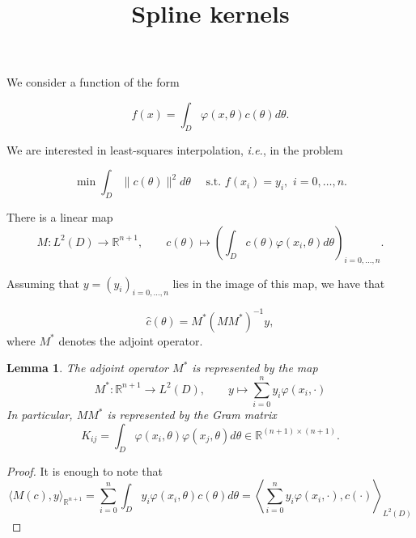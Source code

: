 \documentclass{article}
\title{{\bf Spline kernels}}
\author{}
\date{}
\newtheorem{lemma}[theorem]{Lemma}
\newcommand{\RR}{\mathbb{R}}
\newcommand{\ie}{{\em i.e.}}
\begin{document}
\maketitle


We consider a function of the form

\begin{equation}\label{eq:4-1-1}
f(x) = \int_D \varphi(x,\theta) c(\theta) d\theta.
\end{equation}

We are interested in least-squares interpolation, \ie, in the problem

\begin{equation}\label{eq:4-1-min}
\min \int_D \|c(\theta)\|^2 d\theta \quad \mbox{ s.t. } f(x_i) = y_i, \,\, i=0,\ldots,n.
\end{equation}

There is a linear map
\begin{equation}
M: L^2(D) \rightarrow \RR^{n+1}, \qquad c(\theta) \mapsto \left(\int_D c(\theta) \varphi(x_i,\theta) d\theta \right)_{i=0,\ldots,n}.
\end{equation}

Assuming that $y = (y_i)_{i=0,\ldots,n}$ lies in the image of this map, we have that 

\begin{equation}
    \hat c(\theta) = M^* (MM^*)^{-1} y,
\end{equation}
where $M^*$ denotes the adjoint operator. 

\begin{lemma}
The adjoint operator $M^*$ is represented by the map
\begin{equation}
M^*: \RR^{n+1} \rightarrow L^2(D), \qquad y \mapsto \sum_{i=0}^n y_i \varphi(x_i,\cdot)
\end{equation}
In particular, $MM^*$ is represented by the Gram matrix
\begin{equation}
K_{ij} = \int_D \varphi(x_i,\theta) \varphi(x_j,\theta) d\theta \in \RR^{(n+1)\times(n+1)}.
\end{equation}
\end{lemma}
\begin{proof} It is enough to note that
\begin{equation}
\langle M(c), y \rangle_{\RR^{n+1}} = \sum_{i=0}^n \int_D y_i \varphi(x_i, \theta) c(\theta) d\theta = \left \langle \sum_{i=0}^n y_i \varphi(x_i,\cdot), c(\cdot)  \right \rangle_{L^2(D)}
\end{equation}
\end{proof}
\end{document}
